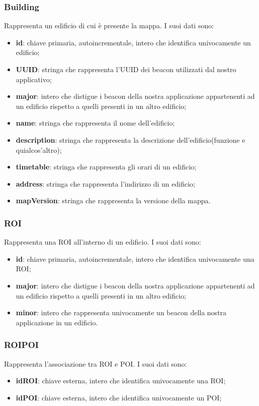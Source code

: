 \documentclass[../SpecificaTecnica.tex]{subfiles}
\begin{document}
		\subsubsection{Building}
			Rappresenta un edificio di cui è presente la mappa. I suoi dati sono:
			\begin{itemize}
				\item \textbf{id}: chiave primaria, autoincrementale, intero che identifica univocamente un edificio;
				\item \textbf{UUID}: stringa che rappresenta l'UUID dei beacon utilizzati dal nostro applicativo;
				\item \textbf{major}: intero che distigue i beacon della nostra applicazione appartenenti ad un edificio rispetto a quelli presenti in un altro edificio;
				\item \textbf{name}: stringa che rappresenta il nome dell'edificio;
				\item \textbf{description}: stringa che rappresenta la descrizione dell'edificio(funzione e quialcos'altro);
				\item \textbf{timetable}: stringa che rappresenta gli orari di un edificio;
				\item \textbf{address}: stringa che rappresenta l'indirizzo di un edificio;
				\item \textbf{mapVersion}: stringa che rappresenta la versione della mappa.
			\end{itemize}
		\subsubsection{ROI}
			Rappresenta una ROI all'interno di un edificio. I suoi dati sono:
			\begin{itemize}
				\item \textbf{id}: chiave primaria, autoincrementale, intero che identifica univocamente una ROI;
				\item \textbf{major}: intero che distigue i beacon della nostra applicazione appartenenti ad un edificio rispetto a quelli presenti in un altro edificio;
				\item \textbf{minor}: intero che rappresenta univocamente un beacon della nostra applicazione in un edificio.
			\end{itemize}
		\subsubsection{ROIPOI}
			Rappresenta l'associazione tra ROI e POI. I suoi dati sono:
			\begin{itemize}
				\item \textbf{idROI}: chiave esterna, intero che identifica univocamente una ROI;
				\item \textbf{idPOI}: chiave esterna, intero che identifica univocamente un POI;
			\end{itemize}
\end{document}
